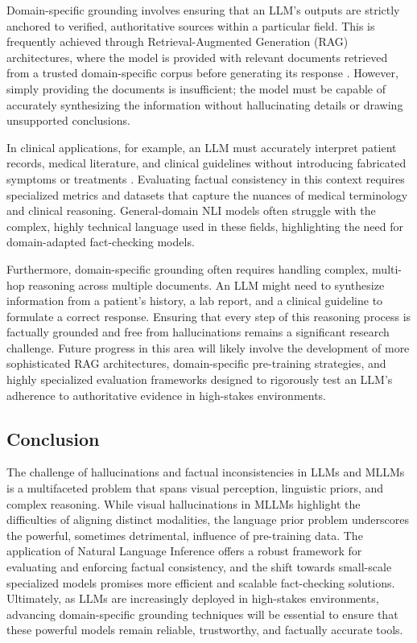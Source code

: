 \documentclass[11pt,a4paper]{article}
\begin{document}
Domain-specific grounding involves ensuring that an LLM's outputs are strictly anchored to verified, authoritative sources within a particular field. This is frequently achieved through Retrieval-Augmented Generation (RAG) architectures, where the model is provided with relevant documents retrieved from a trusted domain-specific corpus before generating its response . However, simply providing the documents is insufficient; the model must be capable of accurately synthesizing the information without hallucinating details or drawing unsupported conclusions.

In clinical applications, for example, an LLM must accurately interpret patient records, medical literature, and clinical guidelines without introducing fabricated symptoms or treatments \cite{Aghaebrahimian_2025_Aligncheck}. Evaluating factual consistency in this context requires specialized metrics and datasets that capture the nuances of medical terminology and clinical reasoning. General-domain NLI models often struggle with the complex, highly technical language used in these fields, highlighting the need for domain-adapted fact-checking models.

Furthermore, domain-specific grounding often requires handling complex, multi-hop reasoning across multiple documents. An LLM might need to synthesize information from a patient's history, a lab report, and a clinical guideline to formulate a correct response. Ensuring that every step of this reasoning process is factually grounded and free from hallucinations remains a significant research challenge. Future progress in this area will likely involve the development of more sophisticated RAG architectures, domain-specific pre-training strategies, and highly specialized evaluation frameworks designed to rigorously test an LLM's adherence to authoritative evidence in high-stakes environments.

\subsection{Conclusion}

The challenge of hallucinations and factual inconsistencies in LLMs and MLLMs is a multifaceted problem that spans visual perception, linguistic priors, and complex reasoning. While visual hallucinations in MLLMs highlight the difficulties of aligning distinct modalities, the language prior problem underscores the powerful, sometimes detrimental, influence of pre-training data. The application of Natural Language Inference offers a robust framework for evaluating and enforcing factual consistency, and the shift towards small-scale specialized models promises more efficient and scalable fact-checking solutions. Ultimately, as LLMs are increasingly deployed in high-stakes environments, advancing domain-specific grounding techniques will be essential to ensure that these powerful models remain reliable, trustworthy, and factually accurate tools.
\end{document}

